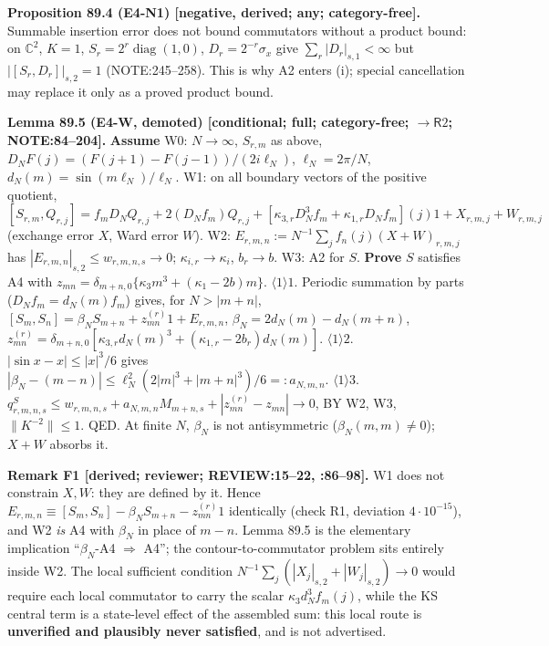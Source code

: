 \textbf{Proposition 89.4 (E4-N1) [negative, derived; any; category-free].}  Summable insertion error does not bound
commutators without a product bound: on \(\mathbb C^2\), \(K=1\), \(S_r=2^r\operatorname{diag}(1,0)\),
\(D_r=2^{-r}\sigma_x\) give \(\sum_r|D_r|_{s,1}<\infty\) but \(|[S_r,D_r]|_{s,2}=1\) (NOTE:245--258).  This is why A2
enters (i); special cancellation may replace it only as a proved product bound.

\textbf{Lemma 89.5 (E4-W, demoted) [conditional; full; category-free; \(\to\mathsf R2\); NOTE:84--204].}
\textbf{Assume} W0: \(N\to\infty\), \(S_{r,m}\) as above, \(D_NF(j)=(F(j+1)-F(j-1))/(2i\ell_N)\), \(\ell_N=2\pi/N\),
\(d_N(m)=\sin(m\ell_N)/\ell_N\).  W1: on all boundary vectors of the positive quotient,
\([S_{r,m},Q_{r,j}]=f_mD_NQ_{r,j}+2(D_Nf_m)Q_{r,j}+[\kappa_{3,r}D_N^3f_m+\kappa_{1,r}D_Nf_m](j)1+X_{r,m,j}+W_{r,m,j}\)
(exchange error \(X\), Ward error \(W\)).  W2: \(E_{r,m,n}:=N^{-1}\sum_jf_n(j)(X+W)_{r,m,j}\) has
\(|E_{r,m,n}|_{s,2}\le w_{r,m,n,s}\to0\); \(\kappa_{i,r}\to\kappa_i\), \(b_r\to b\).  W3: A2 for \(S\).  \textbf{Prove}
\(S\) satisfies A4 with \(z_{mn}=\delta_{m+n,0}\{\kappa_3m^3+(\kappa_1-2b)m\}\).
\(\langle1\rangle1\). Periodic summation by parts (\(D_Nf_m=d_N(m)f_m\)) gives, for \(N>|m+n|\),
\([S_m,S_n]=\beta_NS_{m+n}+z^{(r)}_{mn}1+E_{r,m,n}\), \(\beta_N=2d_N(m)-d_N(m+n)\),
\(z^{(r)}_{mn}=\delta_{m+n,0}[\kappa_{3,r}d_N(m)^3+(\kappa_{1,r}-2b_r)d_N(m)]\).
\(\langle1\rangle2\). \(|\sin x-x|\le|x|^3/6\) gives \(|\beta_N-(m-n)|\le\ell_N^2(2|m|^3+|m+n|^3)/6=:a_{N,m,n}\).
\(\langle1\rangle3\). \(q^S_{r,m,n,s}\le w_{r,m,n,s}+a_{N,m,n}M_{m+n,s}+|z^{(r)}_{mn}-z_{mn}|\to0\), BY W2, W3,
\(\|K^{-2}\|\le1\).  QED.  At finite \(N\), \(\beta_N\) is not antisymmetric (\(\beta_N(m,m)\neq0\)); \(X+W\) absorbs it.

\textbf{Remark F1 [derived; reviewer; REVIEW:15--22, :86--98].}  W1 does not constrain \(X,W\): they are defined by it.
Hence \(E_{r,m,n}\equiv[S_m,S_n]-\beta_NS_{m+n}-z^{(r)}_{mn}1\) identically (check R1, deviation \(4\cdot10^{-15}\)),
and W2 \emph{is} A4 with \(\beta_N\) in place of \(m-n\).  Lemma 89.5 is the elementary implication
``\(\beta_N\)-A4 \(\Rightarrow\) A4''; the contour-to-commutator problem sits entirely inside W2.  The local sufficient
condition \(N^{-1}\sum_j(|X_j|_{s,2}+|W_j|_{s,2})\to0\) would require each local commutator to carry the scalar
\(\kappa_3d_N^3f_m(j)\), while the KS central term is a state-level effect of the assembled sum: this local
route is \textbf{unverified and plausibly never satisfied}, and is not advertised.


